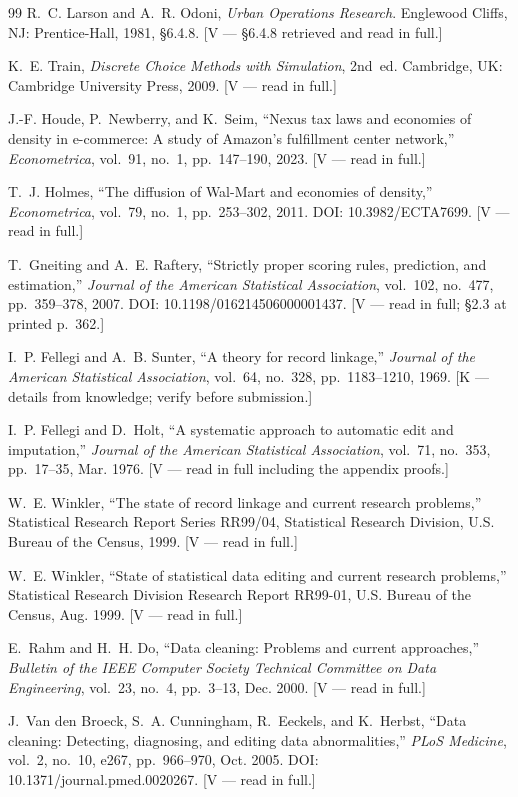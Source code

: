 \documentclass[conference]{IEEEtran}
\begin{document}
\begin{thebibliography}{99}
R.~C. Larson and A.~R. Odoni, \emph{Urban Operations Research}. Englewood
Cliffs, NJ: Prentice-Hall, 1981, \S6.4.8. [V --- \S6.4.8 retrieved and read in
full.]

K.~E. Train, \emph{Discrete Choice Methods with Simulation}, 2nd~ed.
Cambridge, UK: Cambridge University Press, 2009. [V --- read in full.]

J.-F. Houde, P.~Newberry, and K.~Seim, ``Nexus tax laws and economies of
density in e-commerce: A study of Amazon's fulfillment center network,''
\emph{Econometrica}, vol.~91, no.~1, pp.~147--190, 2023. [V --- read in full.]

T.~J. Holmes, ``The diffusion of Wal-Mart and economies of density,''
\emph{Econometrica}, vol.~79, no.~1, pp.~253--302, 2011.
DOI: 10.3982/ECTA7699. [V --- read in full.]

T.~Gneiting and A.~E. Raftery, ``Strictly proper scoring rules, prediction, and
estimation,'' \emph{Journal of the American Statistical Association}, vol.~102,
no.~477, pp.~359--378, 2007. DOI: 10.1198/016214506000001437. [V --- read in
full; \S2.3 at printed p.~362.]

I.~P. Fellegi and A.~B. Sunter, ``A theory for record linkage,'' \emph{Journal
of the American Statistical Association}, vol.~64, no.~328, pp.~1183--1210,
1969. [K --- details from knowledge; verify before submission.]

I.~P. Fellegi and D.~Holt, ``A systematic approach to automatic edit and
imputation,'' \emph{Journal of the American Statistical Association}, vol.~71,
no.~353, pp.~17--35, Mar. 1976. [V --- read in full including the appendix
proofs.]

W.~E. Winkler, ``The state of record linkage and current research problems,''
Statistical Research Report Series RR99/04, Statistical Research Division,
U.S. Bureau of the Census, 1999. [V --- read in full.]

W.~E. Winkler, ``State of statistical data editing and current research
problems,'' Statistical Research Division Research Report RR99-01, U.S. Bureau
of the Census, Aug. 1999. [V --- read in full.]

E.~Rahm and H.~H. Do, ``Data cleaning: Problems and current approaches,''
\emph{Bulletin of the IEEE Computer Society Technical Committee on Data
Engineering}, vol.~23, no.~4, pp.~3--13, Dec. 2000. [V --- read in full.]

J.~Van den Broeck, S.~A. Cunningham, R.~Eeckels, and K.~Herbst, ``Data
cleaning: Detecting, diagnosing, and editing data abnormalities,''
\emph{PLoS Medicine}, vol.~2, no.~10, e267, pp.~966--970, Oct. 2005.
DOI: 10.1371/journal.pmed.0020267. [V --- read in full.]

\end{thebibliography}
\end{document}
